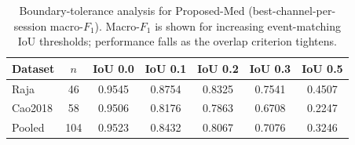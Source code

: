 \begin{table}[ht]
  \centering
  \caption{Boundary-tolerance analysis for Proposed-Med (best-channel-per-session macro-$F_1$). Macro-$F_1$ is shown for increasing event-matching IoU thresholds; performance falls as the overlap criterion tightens.}
  \label{tab:boundary_tolerance}
  \begin{tabular}{lcccccc}
    \toprule
    Dataset & $n$ & IoU 0.0 & IoU 0.1 & IoU 0.2 & IoU 0.3 & IoU 0.5 \\
    \midrule
    Raja & 46 & 0.9545 & 0.8754 & 0.8325 & 0.7541 & 0.4507 \\
    Cao2018 & 58 & 0.9506 & 0.8176 & 0.7863 & 0.6708 & 0.2247 \\
    Pooled & 104 & 0.9523 & 0.8432 & 0.8067 & 0.7076 & 0.3246 \\
    \bottomrule
  \end{tabular}
\end{table}
